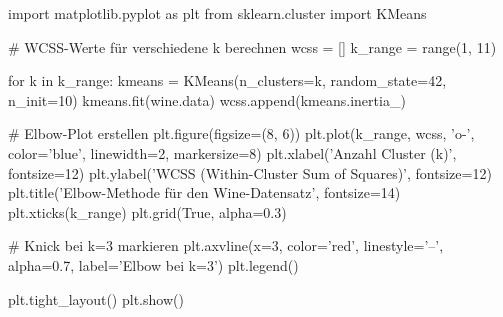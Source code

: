 import matplotlib.pyplot as plt
from sklearn.cluster import KMeans

# WCSS-Werte für verschiedene k berechnen
wcss = []
k_range = range(1, 11)

for k in k_range:
    kmeans = KMeans(n_clusters=k, random_state=42, n_init=10)
    kmeans.fit(wine.data)
    wcss.append(kmeans.inertia_)

# Elbow-Plot erstellen
plt.figure(figsize=(8, 6))
plt.plot(k_range, wcss, 'o-', color='blue', linewidth=2, markersize=8)
plt.xlabel('Anzahl Cluster (k)', fontsize=12)
plt.ylabel('WCSS (Within-Cluster Sum of Squares)', fontsize=12)
plt.title('Elbow-Methode für den Wine-Datensatz', fontsize=14)
plt.xticks(k_range)
plt.grid(True, alpha=0.3)

# Knick bei k=3 markieren
plt.axvline(x=3, color='red', linestyle='--', alpha=0.7, label='Elbow bei k=3')
plt.legend()

plt.tight_layout()
plt.show()